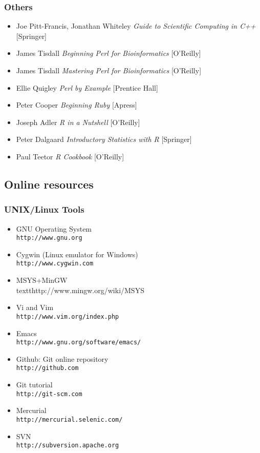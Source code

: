 \documentclass[ChapterTOCs,krantz2]{krantz} %
\begin{document}
\subsubsection{Others}
\begin{itemize}
\item Joe Pitt-Francis, Jonathan Whiteley \emph{Guide to Scientific Computing in C++} [Springer]
\item James Tisdall \emph{Beginning Perl for Bioinformatics} [O'Reilly]
\item James Tisdall \emph{Mastering Perl for Bioinformatics} [O'Reilly]
\item Ellie Quigley \emph{Perl by Example} [Prentice Hall]
\item Peter Cooper \emph{Beginning Ruby} [Apress]
\item Joseph Adler \emph{R in a Nutshell} [O'Reilly]
\item Peter Dalgaard \emph{Introductory Statistics with R} [Springer]
\item Paul Teetor \emph{R Cookbook} [O'Reilly]
\end{itemize}

\subsection{Online resources}
\subsubsection{UNIX/Linux Tools}
\begin{itemize}
\item GNU Operating System\\\texttt{http://www.gnu.org}
\item Cygwin (Linux emulator for Windows)\\\texttt{http://www.cygwin.com}
\item MSYS+MinGW \\textt{http://www.mingw.org/wiki/MSYS}

\item Vi and Vim\\ \texttt{http://www.vim.org/index.php}
\item Emacs\\ \texttt{http://www.gnu.org/software/emacs/}
\item Github: Git online repository\\ \texttt{http://github.com}
\item Git tutorial \\\texttt{http://git-scm.com}
\item Mercurial \\\texttt{http://mercurial.selenic.com/}
\item SVN \\\texttt{http://subversion.apache.org}
\end{itemize}
\end{document}

